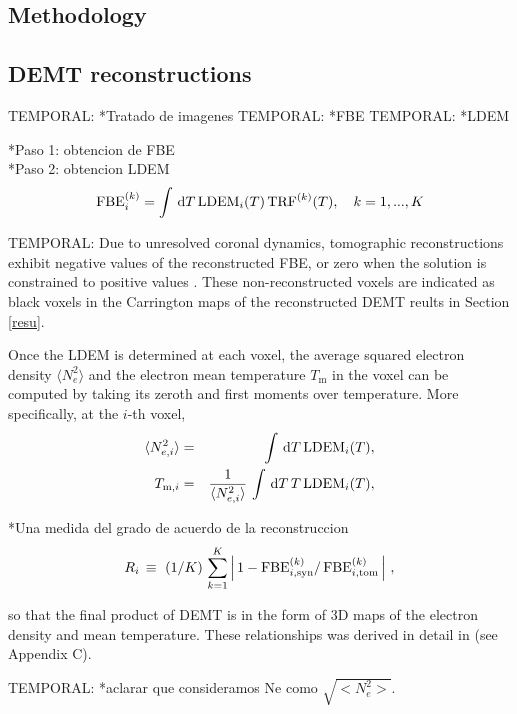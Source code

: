 \documentclass[namedreferences]{solarphysics}
\newcommand{\LDEM}{{\rm LDEM}}
\newcommand{\FBE}{{\rm FBE}}
\newcommand{\TRF}{{\rm TRF}}
\def\temp#1{\textcolor{mygray}{TEMPORAL: #1}}
\begin{document}
\begin{article}
\section{Methodology}\label{meto}   

\subsection{DEMT reconstructions}\label{demt} 
\temp{*Tratado de imagenes}
\temp{*FBE}
\temp{*LDEM}


*Paso 1: obtencion de FBE\\
*Paso 2: obtencion LDEM
\begin{equation}\label{fbeldem}
\FBE_i^{(k)}  = \int\,\textrm{d}T\,\LDEM_i(T)\,{\TRF}^{(k)}(T), \ \ \ {k=1,...,K}
\end{equation}

\temp{
Due to unresolved coronal dynamics, tomographic reconstructions exhibit negative values of the reconstructed FBE, or zero when the solution is constrained to positive values \citep{frazin_2000,frazin_2009}. These non-reconstructed voxels are indicated as black voxels in the Carrington maps of the reconstructed DEMT reults in Section \ref{resu}.
}

Once the LDEM is determined at each voxel, the average squared electron density $\langle N_e^2 \rangle$ and the electron mean temperature $T_\textrm{m}$ in the voxel can be computed by taking its zeroth and first moments over temperature. More specifically, at the $i$-th voxel,
\begin{eqnarray}\label{momento1}
 \langle N_{e,i}^2 \rangle &=& \int\,\textrm{d}T\,\LDEM_i(T),\label{Ne} \\ 
\label{momento2}
 T_{\textrm{m},i}   &=& \frac{1}{\langle N_{e,i}^2 \rangle}\,\int\,\textrm{d}T\,T\,\LDEM_i(T),\label{Tm} 
\end{eqnarray}

*Una medida del grado de acuerdo de la reconstruccion
\begin{equation}\label{R}
R_i \, \equiv \ (1/K) \, \sum_{k=1}^K \left| \, 1 - \FBE^{(k)}_{i,\rm syn} / \,\FBE^{(k)}_{i,\rm tom}\, \right| \,,
\end{equation}

so that the final product of DEMT is in the form of 3D maps of the electron density and mean temperature. These relationships was derived in detail in \citealt{frazin_2009} (see Appendix C). 

\temp{*aclarar que consideramos Ne como $\sqrt{<N_e ^2>}$.}


\end{article}
\end{document}
